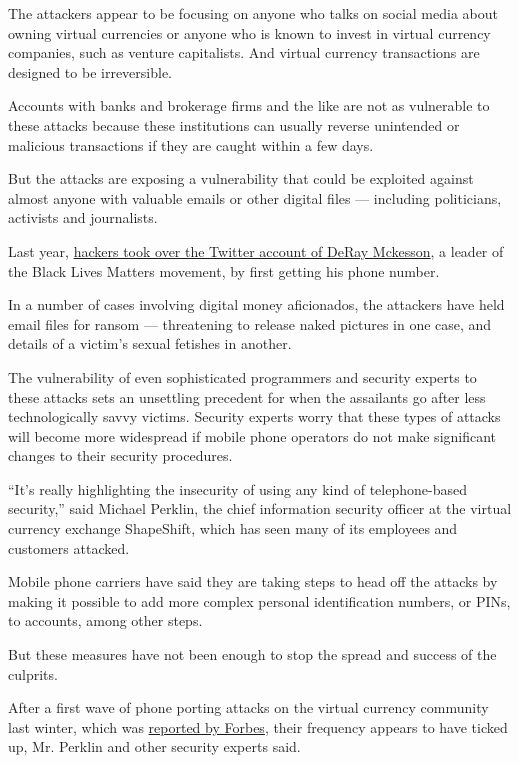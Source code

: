 The attackers appear to be focusing on anyone who talks on social media
about owning virtual currencies or anyone who is known to invest in
virtual currency companies, such as venture capitalists. And virtual
currency transactions are designed to be irreversible.

Accounts with banks and brokerage firms and the like are not as
vulnerable to these attacks because these institutions can usually
reverse unintended or malicious transactions if they are caught within a
few days.

But the attacks are exposing a vulnerability that could be exploited
against almost anyone with valuable emails or other digital files ---
including politicians, activists and journalists.

Last year,
\href{http://www.baltimoresun.com/features/baltimore-insider-blog/bal-black-lives-matter-activist-deray-mckesson-s-twitter-hacked-friday-morning-20160610-story.html}{hackers
took over the Twitter account of DeRay Mckesson}, a leader of the Black
Lives Matters movement, by first getting his phone number.

In a number of cases involving digital money aficionados, the attackers
have held email files for ransom --- threatening to release naked
pictures in one case, and details of a victim's sexual fetishes in
another.

The vulnerability of even sophisticated programmers and security experts
to these attacks sets an unsettling precedent for when the assailants go
after less technologically savvy victims. Security experts worry that
these types of attacks will become more widespread if mobile phone
operators do not make significant changes to their security procedures.

``It's really highlighting the insecurity of using any kind of
telephone-based security,'' said Michael Perklin, the chief information
security officer at the virtual currency exchange ShapeShift, which has
seen many of its employees and customers attacked.

Mobile phone carriers have said they are taking steps to head off the
attacks by making it possible to add more complex personal
identification numbers, or PINs, to accounts, among other steps.

But these measures have not been enough to stop the spread and success
of the culprits.

After a first wave of phone porting attacks on the virtual currency
community last winter, which was
\href{https://www.forbes.com/forbes/welcome/?toURL=https://www.forbes.com/sites/laurashin/2016/12/20/hackers-have-stolen-millions-of-dollars-in-bitcoin-using-only-phone-numbers/\&refURL=https://www.google.com/\&referrer=https://www.google.com/}{reported
by Forbes}, their frequency appears to have ticked up, Mr. Perklin and
other security experts said.

